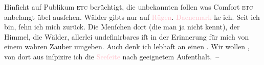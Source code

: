                Hinſicht auf Publikum \textsc{etc} berüchtigt, die unbekannten
               ſollen was Comfor\strikeout{\textcolor{gray}{×}}t \textsc{etc} anbelangt übel ausſehen. Wälder gibts nur auf
                  \textcolor{pink}{Rügen}{}\ledrightnote{\textcolor{pink}{Rügen}}. \textcolor{pink}{Daenemark}{}\ledrightnote{\textcolor{pink}{Dänemark}} ke{\geminationn} ich. Seit ich \label{K_L03003-4v}\label{K_L03003-4h} bin, ſehn ich mich zurück. Die Menſchen dort (die man ja nicht kennt), der
               Himmel, die Wälder, allerlei undefinirbares iſt in der Erinnerung für mich von einem
               wahren Zauber umgeben. Auch denk ich lebhaft an einen \label{K_L03003-5v}\label{K_L03003-5h}. Wir wollen
                  \label{K_L03003-6v}\label{K_L03003-6h}, von dort aus inſpizire
               ich die \textcolor{pink}{Seeſeite}{}\ledrightnote{\textcolor{pink}{Öresund}} nach geeignetem
               Aufenthalt. –\pend
           
